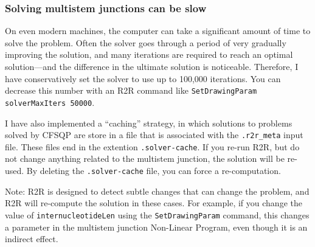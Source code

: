 \documentclass[letterpaper,12pt]{report}
\newcommand{\comment}[1]{}
\begin{document}
\subsubsection{Solving multistem junctions can be slow}

On even modern machines, the computer can take a significant amount of time to solve the problem.
Often the solver goes through a period of very gradually improving the solution, and many iterations are required to reach an optimal solution---and the difference in the ultimate solution is noticeable.
Therefore, I have conservatively set the solver to use up to 100,000 iterations.
You can decrease this number with an R2R command like {\tt SetDrawingParam solverMaxIters 50000}.

I have also implemented a ``caching'' strategy, in which solutions to problems solved by CFSQP are store in a file that is associated with the {\tt .r2r\_meta} input file.
These files end in the extention {\tt .solver-cache}.
If you re-run R2R, but do not change anything related to the multistem junction, the solution will be re-used.
By deleting the {\tt .solver-cache} file, you can force a re-computation.

Note: R2R is designed to detect subtle changes that can change the problem, and R2R will
re-compute the solution in these cases.  For example, if you change the value of
{\tt internucleotideLen} using the {\tt SetDrawingParam} command, this changes a parameter
in the multistem junction Non-Linear Program, even though it is an indirect effect.
\comment{
Another way of improving speed is to define the {\tt R2R\_DUMP\_FILE} environment variable in your UNIX shell before running {\tt r2r}.
This is done by the default {\tt Makefile} in the {\tt demo} subdirectory.
This environment variable specifies the name of a file, and in the default {\tt Makefile}, the file is {\tt dump-file.txt}.
R2R will output {\tt multistem\_junction\_bulgey} commands into this file that are equivalent to {\tt \_solver} command.
You can substitute these commands to generate the same layout without the CPU time.
}
\end{document}
